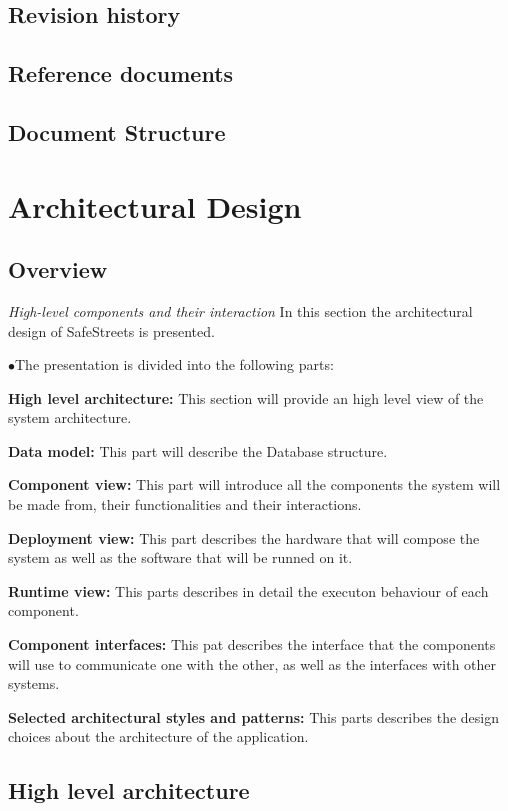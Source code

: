 \documentclass{article}
\begin{document}
	\subsection{Revision history}
	\subsection{Reference documents}
	\subsection{Document Structure}

\section{Architectural Design}
	\subsection{Overview} \textit{High-level components and their interaction}
	In this section the architectural design of SafeStreets is presented. 
	\begin{list}{$\bullet$}{The presentation is divided into the following parts:}
		\item \textbf{High level architecture:} 
			This section will provide an high level view of the system architecture.
		\item \textbf{Data model:}
			This part will describe the Database structure.
		\item \textbf{Component view:} 
			This part will introduce all the components the system will be made from, their functionalities and their interactions.
		\item \textbf{Deployment view:} 
			This part describes the hardware that will compose the system as well as the software that will be runned on it.
		\item \textbf{Runtime view:} 
			This parts describes in detail the executon behaviour of each component.
		\item \textbf{Component interfaces:} 
			This pat describes the interface that the components will use to communicate one with the other, as well as the interfaces with other
			systems.
		\item \textbf{Selected architectural styles and patterns:} 
			This parts describes the design choices  about the architecture of the application.
	\end{list}
	\subsection{High level architecture}
\end{document}
